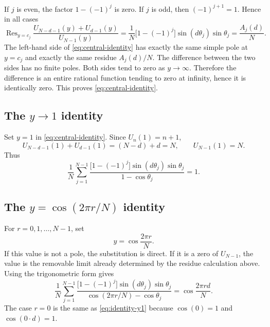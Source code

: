 \documentclass[11pt]{article}
\DeclareMathOperator{\Res}{Res}
\begin{document}
If $j$ is even, the factor $1-(-1)^j$ is zero.  If $j$ is odd, then
$(-1)^{j+1}=1$.  Hence in all cases
\begin{equation}
  \Res_{y=c_j}\frac{U_{N-d-1}(y)+U_{d-1}(y)}{U_{N-1}(y)}
  =\frac{1}{N}\bigl[1-(-1)^j\bigr]\sin(d\theta_j)\sin\theta_j
  =\frac{A_j(d)}{N}.
  \label{eq:residue-rhs-final}
\end{equation}
The left-hand side of \eqref{eq:central-identity} has exactly the same simple pole at $y=c_j$
and exactly the same residue $A_j(d)/N$.  The difference between the two sides has no finite
poles.  Both sides tend to zero as $y\to\infty$.  Therefore the difference is an entire rational
function tending to zero at infinity, hence it is identically zero.  This proves
\eqref{eq:central-identity}.

\subsection{The \texorpdfstring{$y\to1$}{y to 1} identity}

Set $y=1$ in \eqref{eq:central-identity}.  Since $U_n(1)=n+1$,
\begin{equation}
  U_{N-d-1}(1)+U_{d-1}(1)=(N-d)+d=N,
  \qquad
  U_{N-1}(1)=N.
\end{equation}
Thus
\begin{equation}
  \boxed{
  \frac1N\sum_{j=1}^{N-1}
  \frac{\bigl[1-(-1)^j\bigr]\sin(d\theta_j)\sin\theta_j}
  {1-\cos\theta_j}=1.}
  \label{eq:identity-y1}
\end{equation}

\subsection{The \texorpdfstring{$y=\cos(2\pi r/N)$}{y = cos(2pi r/N)} identity}

For $r=0,1,\ldots,N-1$, set
\begin{equation}
  y=\cos\frac{2\pi r}{N}.
\end{equation}
If this value is not a pole, the substitution is direct.  If it is a zero of $U_{N-1}$, the value
is the removable limit already determined by the residue calculation above.  Using the
trigonometric form gives
\begin{equation}
  \boxed{
  \frac1N\sum_{j=1}^{N-1}
  \frac{\bigl[1-(-1)^j\bigr]\sin(d\theta_j)\sin\theta_j}
  {\cos(2\pi r/N)-\cos\theta_j}
  =\cos\frac{2\pi r d}{N}.}
  \label{eq:identity-y-even}
\end{equation}
The case $r=0$ is the same as \eqref{eq:identity-y1} because
$\cos(0)=1$ and $\cos(0\cdot d)=1$.
\end{document}
